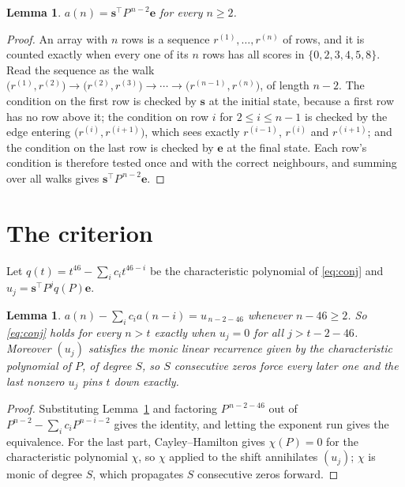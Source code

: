 \documentclass[11pt,a4paper]{article}
\theoremstyle{plain}
\newtheorem{lemma}[theorem]{Lemma}
\theoremstyle{definition}
\begin{document}
\begin{lemma}\label{lem:walk}
$a(n)=\mathbf{s}^{\!\top}P^{\,n-2}\mathbf{e}$ for every $n\ge2$.
\end{lemma}

\begin{proof}
An array with $n$ rows is a sequence $r^{(1)},\dots,r^{(n)}$ of rows, and it is counted
exactly when every one of its $n$ rows has all scores in $\{0,2,3,4,5,8\}$. Read the sequence as the
walk $\bigl(r^{(1)},r^{(2)}\bigr)\to\bigl(r^{(2)},r^{(3)}\bigr)\to\cdots\to
\bigl(r^{(n-1)},r^{(n)}\bigr)$, of length $n-2$. The condition on the first row is
checked by $\mathbf{s}$ at the initial state, because a first row has no row above it; the
condition on row $i$ for $2\le i\le n-1$ is checked by the edge entering
$\bigl(r^{(i)},r^{(i+1)}\bigr)$, which sees exactly $r^{(i-1)}$, $r^{(i)}$ and
$r^{(i+1)}$; and the condition on the last row is checked by $\mathbf{e}$ at the final
state. Each row's condition is therefore tested once and with the correct neighbours, and
summing over all walks gives $\mathbf{s}^{\!\top}P^{\,n-2}\mathbf{e}$.
\end{proof}

\section{The criterion}

Let $q(t)=t^{46}-\sum_i c_i t^{46-i}$ be the characteristic polynomial of
\eqref{eq:conj} and $u_j=\mathbf{s}^{\!\top}P^{j}q(P)\mathbf{e}$.

\begin{lemma}\label{lem:crit}
$a(n)-\sum_i c_i a(n-i)=u_{\,n-2-46}$ whenever $n-46\ge2$. So \eqref{eq:conj}
holds for every $n>t$ exactly when $u_j=0$ for all $j>t-2-46$. Moreover $(u_j)$
satisfies the monic linear recurrence given by the characteristic polynomial of $P$, of
degree $S$, so $S$ consecutive zeros force every later one and the last nonzero $u_j$ pins
$t$ down exactly.
\end{lemma}

\begin{proof}
Substituting Lemma~\ref{lem:walk} and factoring $P^{\,n-2-46}$ out of
$P^{n-2}-\sum_i c_i P^{n-i-2}$ gives the identity, and letting the exponent run gives the
equivalence. For the last part, Cayley--Hamilton gives $\chi(P)=0$ for the characteristic
polynomial $\chi$, so $\chi$ applied to the shift annihilates $(u_j)$; $\chi$ is monic of
degree $S$, which propagates $S$ consecutive zeros forward.
\end{proof}
\end{document}
